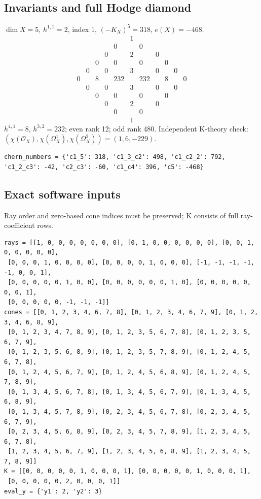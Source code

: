 \documentclass[10pt,a4paper]{article}
\begin{document}
\subsection*{Invariants and full Hodge diamond}
$\dim X=5$, $h^{1,1}=2$, index $1$, $(-K_X)^5=318$, $e(X)=-468$.
\[\begin{array}{ccccccccccc}&&&&&1&&&&&\\&&&&0&&0&&&&\\&&&0&&2&&0&&&\\&&0&&0&&0&&0&&\\&0&&0&&3&&0&&0&\\0&&8&&232&&232&&8&&0\\&0&&0&&3&&0&&0&\\&&0&&0&&0&&0&&\\&&&0&&2&&0&&&\\&&&&0&&0&&&&\\&&&&&1&&&&&\end{array}\]
$h^{4,1}=8$, $h^{3,2}=232$; even rank 12; odd rank 480.
Independent K-theory check: $(\chi(\mathcal O_X),\chi(\Omega_X^1),\chi(\Omega_X^2))=(1, 6, -229)$.
\begin{lstlisting}
chern_numbers = {'c1_5': 318, 'c1_3_c2': 498, 'c1_c2_2': 792, 'c1_2_c3': -42, 'c2_c3': -60, 'c1_c4': 396, 'c5': -468}
\end{lstlisting}
\subsection*{Exact software inputs}
Ray order and zero-based cone indices must be preserved; K consists of full ray-coefficient rows.
\begin{lstlisting}
rays = [[1, 0, 0, 0, 0, 0, 0, 0], [0, 1, 0, 0, 0, 0, 0, 0], [0, 0, 1, 0, 0, 0, 0, 0],
 [0, 0, 0, 1, 0, 0, 0, 0], [0, 0, 0, 0, 1, 0, 0, 0], [-1, -1, -1, -1, -1, 0, 0, 1],
 [0, 0, 0, 0, 0, 1, 0, 0], [0, 0, 0, 0, 0, 0, 1, 0], [0, 0, 0, 0, 0, 0, 0, 1],
 [0, 0, 0, 0, 0, -1, -1, -1]]
cones = [[0, 1, 2, 3, 4, 6, 7, 8], [0, 1, 2, 3, 4, 6, 7, 9], [0, 1, 2, 3, 4, 6, 8, 9],
 [0, 1, 2, 3, 4, 7, 8, 9], [0, 1, 2, 3, 5, 6, 7, 8], [0, 1, 2, 3, 5, 6, 7, 9],
 [0, 1, 2, 3, 5, 6, 8, 9], [0, 1, 2, 3, 5, 7, 8, 9], [0, 1, 2, 4, 5, 6, 7, 8],
 [0, 1, 2, 4, 5, 6, 7, 9], [0, 1, 2, 4, 5, 6, 8, 9], [0, 1, 2, 4, 5, 7, 8, 9],
 [0, 1, 3, 4, 5, 6, 7, 8], [0, 1, 3, 4, 5, 6, 7, 9], [0, 1, 3, 4, 5, 6, 8, 9],
 [0, 1, 3, 4, 5, 7, 8, 9], [0, 2, 3, 4, 5, 6, 7, 8], [0, 2, 3, 4, 5, 6, 7, 9],
 [0, 2, 3, 4, 5, 6, 8, 9], [0, 2, 3, 4, 5, 7, 8, 9], [1, 2, 3, 4, 5, 6, 7, 8],
 [1, 2, 3, 4, 5, 6, 7, 9], [1, 2, 3, 4, 5, 6, 8, 9], [1, 2, 3, 4, 5, 7, 8, 9]]
K = [[0, 0, 0, 0, 0, 1, 0, 0, 0, 1], [0, 0, 0, 0, 0, 1, 0, 0, 0, 1],
 [0, 0, 0, 0, 0, 2, 0, 0, 0, 1]]
eval_y = {'y1': 2, 'y2': 3}
\end{lstlisting}
\end{document}
